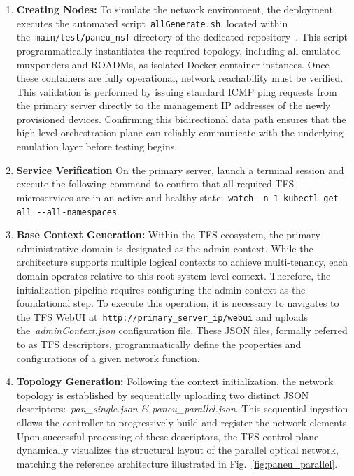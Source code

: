 \documentclass[12pt, a4paper, twoside, openright]{report}
\begin{document}
\begin{enumerate}
    \item \textbf{Creating Nodes:} To simulate the network environment, the deployment executes the automated script~\verb|allGenerate.sh|, located within the~\verb|main/test/paneu_nsf| directory of the dedicated repository~\cite{pocgit}. This script programmatically instantiates the required topology, including all emulated muxponders and ROADMs, as isolated Docker container instances. Once these containers are fully operational, network reachability must be verified. This validation is performed by issuing standard ICMP ping requests from the primary server directly to the management IP addresses of the newly provisioned devices. Confirming this bidirectional data path ensures that the high-level orchestration plane can reliably communicate with the underlying emulation layer before testing begins.
    \item \textbf{Service Verification} On the primary server, launch a terminal session and execute the following command to confirm that all required TFS microservices are in an active and healthy state:~\verb|watch -n 1 kubectl get all --all-namespaces|.
    \item \textbf{Base Context Generation:} Within the TFS ecosystem, the primary administrative domain is designated as the admin context. While the architecture supports multiple logical contexts to achieve multi-tenancy, each domain operates relative to this root system-level context. Therefore, the initialization pipeline requires configuring the admin context as the foundational step. To execute this operation, it is necessary to navigates to the TFS WebUI at~\verb|http://primary_server_ip/webui| and uploads the~\emph{adminContext.json} configuration file. These JSON files, formally referred to as TFS descriptors, programmatically define the properties and configurations of a given network function.
    \item \textbf{Topology Generation:} Following the context initialization, the network topology is established by sequentially uploading two distinct JSON descriptors:~\emph{pan\_single.json \& paneu\_parallel.json}. This sequential ingestion allows the controller to progressively build and register the network elements. Upon successful processing of these descriptors, the TFS control plane dynamically visualizes the structural layout of the parallel optical network, matching the reference architecture illustrated in Fig.~\ref{fig:paneu_parallel}.
\end{enumerate}
\end{document}
